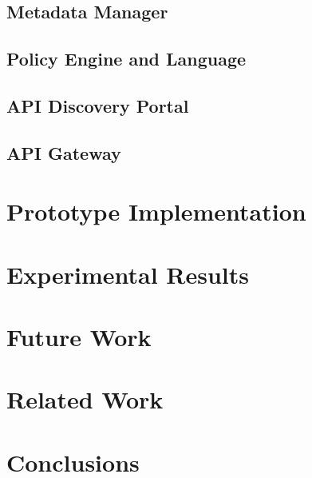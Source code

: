 \documentclass[conference]{acm_proc_article-sp}
\begin{document}
\subsection{Metadata Manager}
\subsection{Policy Engine and Language}
\subsection{API Discovery Portal}
\subsection{API Gateway}

\section{Prototype Implementation}

\section{Experimental Results}
%

%

\section{Future Work}
%

\section{Related Work}
%

\section{Conclusions}
%

\footnotesize


\end{document}
